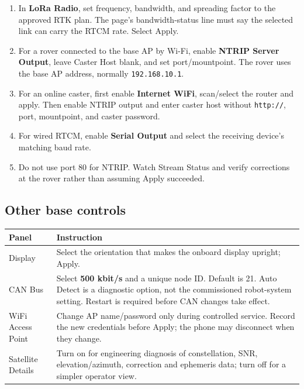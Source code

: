 \documentclass[
  10pt,
  letterpaper,
  openany]{report}
\newcounter{none} %
\providecommand{\tightlist}{%
  \setlength{\itemsep}{0pt}\setlength{\parskip}{0pt}}
\begin{document}
\begin{enumerate}
\tightlist
\item
  In \textbf{LoRa Radio}, set frequency, bandwidth, and spreading factor
  to the approved RTK plan. The page's bandwidth-status line must say
  the selected link can carry the RTCM rate. Select Apply.
\item
  For a rover connected to the base AP by Wi-Fi, enable \textbf{NTRIP
  Server Output}, leave Caster Host blank, and set port/mountpoint. The
  rover uses the base AP address, normally \texttt{192.168.10.1}.
\item
  For an online caster, first enable \textbf{Internet WiFi}, scan/select
  the router and apply. Then enable NTRIP output and enter caster host
  without \texttt{http://}, port, mountpoint, and caster password.
\item
  For wired RTCM, enable \textbf{Serial Output} and select the receiving
  device's matching baud rate.
\item
  Do not use port 80 for NTRIP. Watch Stream Status and verify
  corrections at the rover rather than assuming Apply succeeded.
\end{enumerate}

\subsection{Other base controls}\label{other-base-controls}

{\def\LTcaptype{none} %
\begin{longtable}[]{@{}
  >{\raggedright\arraybackslash}p{}
  >{\raggedright\arraybackslash}p{}@{}}
\toprule\noalign{}
\begin{minipage}[b]{\linewidth}\raggedright
Panel
\end{minipage} & \begin{minipage}[b]{\linewidth}\raggedright
Instruction
\end{minipage} \\
\midrule\noalign{}
\endhead
\bottomrule\noalign{}
\endlastfoot
Display & Select the orientation that makes the onboard display upright;
Apply. \\
CAN Bus & Select \textbf{500 kbit/s} and a unique node ID. Default is
21. Auto Detect is a diagnostic option, not the commissioned
robot-system setting. Restart is required before CAN changes take
effect. \\
WiFi Access Point & Change AP name/password only during controlled
service. Record the new credentials before Apply; the phone may
disconnect when they change. \\
Satellite Details & Turn on for engineering diagnosis of constellation,
SNR, elevation/azimuth, correction and ephemeris data; turn off for a
simpler operator view. \\
\end{longtable}
}
\end{document}
